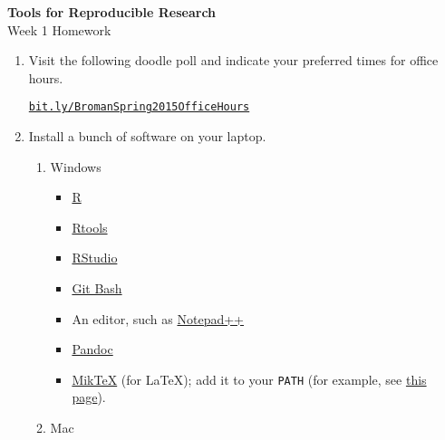 \documentclass[12pt]{article}
\newcommand{\ttsm}{\tt \small}
\begin{document}
\thispagestyle{empty}

\textbf{Tools for Reproducible Research} \\
Week 1 Homework

\bigskip

\begin{enumerate}
\item Visit the following doodle poll and indicate your preferred
  times for office hours.

  \href{http://doodle.com/rrw8skdzadnymide}{\ttsm bit.ly/BromanSpring2015OfficeHours}

\item Install a bunch of software on your laptop.

  \begin{enumerate}
  \item Windows

    \begin{itemize}
    \item \href{http://cran.rstudio.com/bin/windows/base/}{R}
    \item \href{http://cran.rstudio.com/bin/windows/Rtools/Rtools32.exe}{Rtools}
    \item \href{http://www.rstudio.com/products/rstudio/download/}{RStudio}
    \item \href{http://msysgit.github.io/}{Git Bash}
    \item An editor, such as \href{http://notepad-plus-plus.org/download}{Notepad++}
    \item \href{http://johnmacfarlane.net/pandoc/installing.html}{Pandoc}
    \item \href{http://miktex.org/download}{MikTeX} (for LaTeX); add
      it to your {\ttsm PATH} (for example, see
      \href{http://www.howtogeek.com/118594/how-to-edit-your-system-path-for-easy-command-line-access/}{this page}).
    \end{itemize}


  \item Mac


\end{enumerate}
\end{enumerate}
\end{document}
